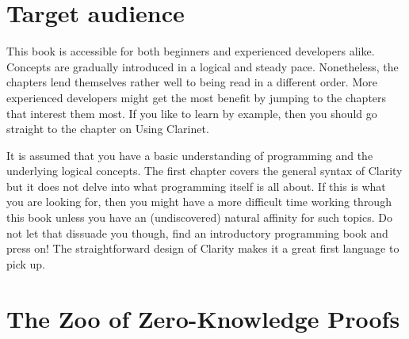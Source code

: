 \section{Target audience}

This book is accessible for both beginners and experienced developers alike. Concepts are gradually introduced in a logical and steady pace. Nonetheless, the chapters lend themselves rather well to being read in a different order. More experienced developers might get the most benefit by jumping to the chapters that interest them most. If you like to learn by example, then you should go straight to the chapter on Using Clarinet.

It is assumed that you have a basic understanding of programming and the underlying logical concepts. The first chapter covers the general syntax of Clarity but it does not delve into what programming itself is all about. If this is what you are looking for, then you might have a more difficult time working through this book unless you have an (undiscovered) natural affinity for such topics. Do not let that dissuade you though, find an introductory programming book and press on! The straightforward design of Clarity makes it a great first language to pick up.

\section{The Zoo of Zero-Knowledge Proofs}

